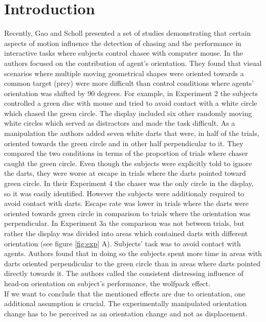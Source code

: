 \documentclass[10pt]{article}
\begin{document}
\section*{Introduction}
Recently, Gao and Scholl presented a set of studies \cite{gao09,gao10,gao11} demonstrating that certain aspects of motion influence the detection of chasing and the performance in interactive tasks where subjects control chasee with computer mouse. 
In \cite{gao10} the authors focused on the contribution of agent's orientation. 
They found that visual scenarios where multiple moving geometrical shapes were oriented towards a common target (prey) were more difficult than control conditions where agents' orientation was shifted by 90 degrees. 
For example, in Experiment 2 the subjects controlled a green disc with mouse and tried to avoid contact with a white circle which chased the green circle. 
The display included six other randomly moving white circles which served as distractors and made the task difficult. 
As a manipulation the authors added seven white darts that were, in half of the trials, oriented towards the green circle and in other half perpendicular to it. 
They compared the two conditions in terms of the proportion of trials where chaser caught the green circle. 
Even though the subjects were explicitly told to ignore the darts, they were worse at escape in trials where the darts pointed toward green circle. 
In their Experiment 4 the chaser was the only circle in the display, so it was easily identified. 
However the subjects were additionaly required to avoid contact with darts. 
Escape rate was lower in trials where the darts were oriented towards green circle in comparison to trials where the orientation was perpendicular. 
In Experiment 3a the comparison was not between trials, but rather the display was divided into areas which contained darts with different orientation (see figure \ref{fig:exp} A). 
Subjects' task was to avoid contact with agents. 
Authors found that in doing so the subjects spent more time in areas with darts oriented perpendicular to the green circle than in areas where darts pointed directly towards it.
The authors called the consistent distressing influence of head-on orientation on subject's performance, the wolfpack effect.\\
If we want to conclude that the mentioned effects are due to orientation, one additional assumption is crucial. 
The experimentally manipulated orientation change has to be perceived as an orientation change and not as displacement. 
\end{document}
